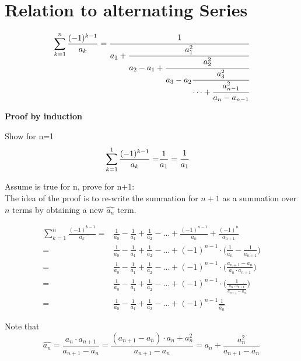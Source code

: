 \documentclass[a4paper]{article}
\begin{document}
    \section{Relation to alternating Series}\label{sec:relation-to-alternating-series}

    \begin{theorem}
        \label{relation_to_series}
        \[
        \sum_{k=1}^{n} \frac{(-1)^{k-1}}{a_k} = \cfrac{1}{a_1+\cfrac{a_{1}^{2}}{a_2 - a_1 +\cfrac{a_2^2}{a_3 - a_2
        \cfrac{a_3^2}{\cdots + \cfrac{a_{n-1}^2}{a_n - a_{n-1}}}}}}
        \]

        \textbf{Proof by induction}

        Show for n=1
        \begin{align*}
            \sum_{k=1}^{1} \frac{(-1)^{k-1}}{a_k} =& \frac{1}{a_1} = \cfrac{1}{a_1}
        \end{align*}

        Assume is true for n, prove for n+1:
        \\
        The idea of the proof is to re-write the summation for $n+1$ as a summation over $n$ terms by obtaining a new $\widehat{a_n}$ term.

        \begin{align*}
            \sum_{k=1}^{n} \frac{(-1)^{k-1}}{a_k} =& \frac{1}{a_0} - \frac{1}{a_1} + \frac{1}{a_2} - \dots + \frac{(-1)^{n-1}}{a_{n}} + \frac{(-1)^{n}}{a_{n+1}}
            \\
            =& \frac{1}{a_0} - \frac{1}{a_1} + \frac{1}{a_2} - \dots + (-1)^{n-1} \cdot \Big( \frac{1}{a_{n}} - \frac{1}{a_{n+1}} \Big)
            \\
            =& \frac{1}{a_0} - \frac{1}{a_1} + \frac{1}{a_2} - \dots + (-1)^{n-1} \cdot \Big( \frac{a_{n+1} - a_{n}}{a_{n}\cdot a_{n+1}} \Big)
            \\
            =& \frac{1}{a_0} - \frac{1}{a_1} + \frac{1}{a_2} - \dots + (-1)^{n-1} \cdot \Big( \frac{1}{\frac{a_{n}\cdot a_{n+1}}{a_{n+1} - a_{n}}}  \Big)
            \\
            =& \frac{1}{a_0} - \frac{1}{a_1} + \frac{1}{a_2} - \dots + (-1)^{n-1} \frac{1}{\widehat{a_n}}
        \end{align*}

        Note that
        \begin{equation*}
            \widehat{a_n}
            =
            \frac{a_{n}\cdot a_{n+1}}{a_{n+1} - a_{n}} =
            \frac{(a_{n+1} - a_n)\cdot a_{n} + a_n^2}{a_{n+1} - a_{n}} = a_{n} + \frac{a_n^2}{a_{n+1} - a_{n}}
        \end{equation*}


\end{theorem}
\end{document}
